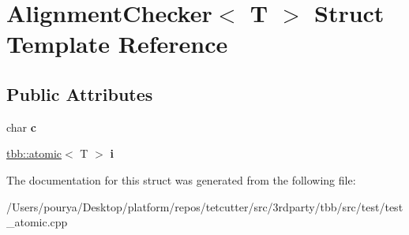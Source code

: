 \hypertarget{structAlignmentChecker}{}\section{Alignment\+Checker$<$ T $>$ Struct Template Reference}
\label{structAlignmentChecker}
\subsection*{Public Attributes}
\begin{DoxyCompactItemize}
\item 
\hypertarget{structAlignmentChecker_a0a0fb33e55f0afcc98b4aa7c9f8074f9}{}char {\bfseries c}\label{structAlignmentChecker_a0a0fb33e55f0afcc98b4aa7c9f8074f9}

\item 
\hypertarget{structAlignmentChecker_aa0d838a2d58b96496cd7ea55c3899f61}{}\hyperlink{structtbb_1_1atomic}{tbb\+::atomic}$<$ T $>$ {\bfseries i}\label{structAlignmentChecker_aa0d838a2d58b96496cd7ea55c3899f61}

\end{DoxyCompactItemize}


The documentation for this struct was generated from the following file\+:\begin{DoxyCompactItemize}
\item 
/\+Users/pourya/\+Desktop/platform/repos/tetcutter/src/3rdparty/tbb/src/test/test\+\_\+atomic.\+cpp\end{DoxyCompactItemize}
